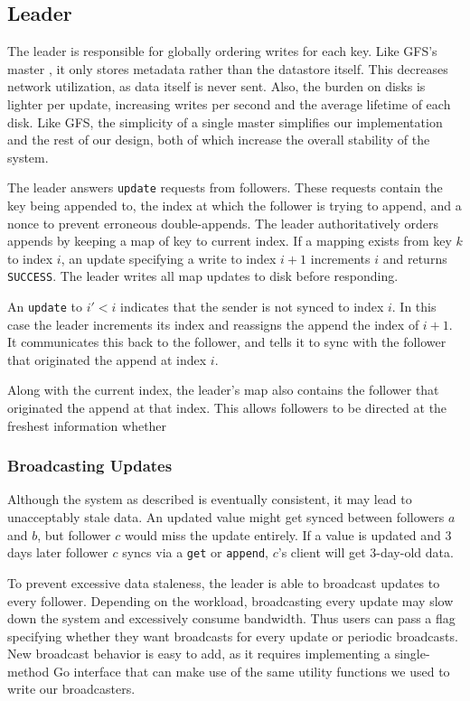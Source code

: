 \documentclass[11pt,english,twocolumn]{article}
\begin{document}
\subsection{Leader}
The leader is responsible for globally ordering writes for each key. Like GFS's
master \cite{GFS}, it only stores metadata rather than the datastore itself.
This decreases network utilization, as data itself is never sent.  Also, the
burden on disks is lighter per update, increasing writes per second and the
average lifetime of each disk. Like GFS, the simplicity of a single master
simplifies our implementation and the rest of our design, both of which increase
the overall stability of the system.

The leader answers \texttt{update} requests from followers. These requests
contain the key being appended to, the index at which the follower is trying
to append, and a nonce to prevent erroneous double-appends. The leader
authoritatively orders appends by keeping a map of key to current index. If a
mapping exists from key $k$ to index $i$, an update specifying a write to index
$i+1$ increments $i$ and returns \texttt{SUCCESS}. The leader writes all map
updates to disk before responding.

An \texttt{update} to $i' < i$ indicates that the sender is not synced to index
$i$. In this case the leader increments its index and reassigns the append the
index of $i+1$. It communicates this back to the follower, and tells it to
sync with the follower that originated the append at index $i$.

Along with the current index, the leader's map also contains the follower that
originated the append at that index. This allows followers to be directed at the
freshest information whether 

\subsubsection{Broadcasting Updates}
Although the system as described is eventually consistent, it may lead to
unacceptably stale data. An updated value might get synced between followers
$a$ and $b$, but follower $c$ would miss the update entirely. If a value is
updated and 3 days later follower $c$ syncs via a \texttt{get} or
\texttt{append}, $c$'s client will get 3-day-old data.

To prevent excessive data staleness, the leader is able to broadcast updates to
every follower. Depending on the workload, broadcasting every update may slow
down the system and excessively consume bandwidth. Thus users can pass a flag
specifying whether they want broadcasts for every update or periodic broadcasts.
New broadcast behavior is easy to add, as it requires implementing a
single-method Go interface that can make use of the same utility functions we
used to write our broadcasters.
\end{document}
